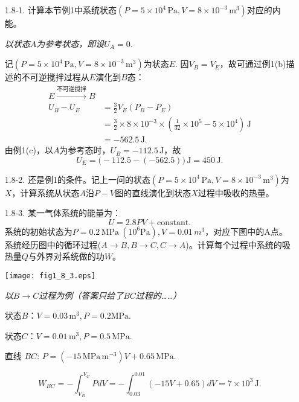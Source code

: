 \begin{enumerate}
	\item[1.8-1.]
		计算本节例1中系统状态$(P = 5 \times 10^4 \,\mathrm{Pa}, V = 8 \times 10^{-3}\, \mathrm{m}^3)$对应的内能。

		{\it
			以状态$A$为参考状态，即设$U_A = 0$.

			记$(P = 5 \times 10^4 \,\mathrm{Pa}, V = 8 \times 10^{-3}\, \mathrm{m}^3)$为状态$E$. 因$V_B = V_E$，故可通过例1(b)描述的不可逆搅拌过程从$E$演化到$B$态：
			\begin{align*}
				E \stackrel{{\text{不可逆搅拌}} }{\longrightarrow} B \\
				U_B - U_E &= \frac{3}{2} V_E (P_B - P_E) \\
				&= \frac{3}{2} \times 8 \times 10^{-3} \times \left( \frac{1}{32} \times 10^{5} - 5 \times 10^{4} \right) \,\mathrm{J} \\
				&= -562.5 \,\mathrm{J}.
			\end{align*}
			由例1(c)，以$A$为参考态时，$U_B = -112.5 \,\mathrm{J}$，故 
			\begin{equation*}
				U_E = \big(-112.5 - (-562.5) \big) \,\mathrm{J} = 450 \,\mathrm{J}.
			\end{equation*}
		}
	
	\item[1.8-2.]
		还是例1的条件。记上一问的状态$(P = 5\times 10^4 \,\mathrm{Pa}, V = 8 \times 10^{-3} \,\mathrm{m}^3)$为$X$，计算系统从状态$A$沿$P-V$图的直线演化到状态$X$过程中吸收的热量。

	\item[1.8-3.]
		某一气体系统的能量为：
		\[ U = 2.8 PV + \text{constant}. \]
		系统的初始状态为$P = 0.2\, \mathrm{MPa}\ (10^{6} \mathrm{Pa}), V = 0.01\, m^3$，对应下图中的A点。系统经历图中的循环过程($A \to B, B \to C, C \to A$)。计算每个过程中系统的吸热量$Q$与外界对系统做的功$W$。
		
		
		{
			\centering
			\texttt{[image: fig1\_8\_3.eps]}
			\notag
		}
		
		
		{\it
			以$B \to C$过程为例（答案只给了$BC$过程的……）
		
			状态$B$：$V = 0.03\, \mathrm{m}^3, P = 0.2 \mathrm{MPa}$.

			状态$C$：$V = 0.01 \,\mathrm{m}^3, P = 0.5 \,\mathrm{MPa}.$

			直线 $BC$: $P = (-15\, \mathrm{MPa \, m^{-3}}) V + 0.65\, \mathrm{MPa}$.

			\[ W_{BC} = -\int_{V_B}^{V_C} PdV = -\int_{0.03}^{0.01} (-15V + 0.65) dV = 7 \times 10^3 \,\mathrm{J}. \]

}
\end{enumerate}
